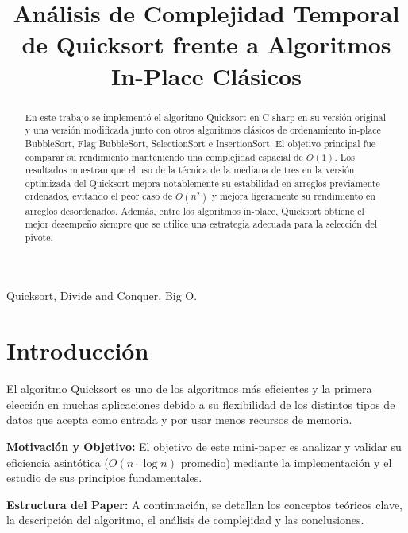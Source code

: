 \documentclass[conference]{IEEEtran}
\begin{document}
\title{Análisis de Complejidad Temporal de Quicksort frente a Algoritmos In-Place Clásicos}

\author{
\and
{}
}

\maketitle

\begin{abstract}
En este trabajo se implementó el algoritmo Quicksort en C sharp en su versión original y una versión modificada junto con otros algoritmos clásicos de ordenamiento in-place BubbleSort, Flag BubbleSort, SelectionSort e InsertionSort.
El objetivo principal fue comparar su rendimiento manteniendo una complejidad espacial de $O(1)$.
Los resultados muestran que  el uso de la técnica de la mediana de tres en la versión optimizada del Quicksort mejora notablemente su estabilidad en arreglos previamente ordenados, evitando el peor caso de $O(n^2)$ y mejora ligeramente su rendimiento en arreglos desordenados.
Además, entre los algoritmos in-place, Quicksort obtiene el mejor desempeño siempre que se utilice una estrategia adecuada para la selección del pivote.
\end{abstract}

\begin{IEEEkeywords}
Quicksort, Divide and Conquer, Big O.
\end{IEEEkeywords}


\section{Introducción}

El algoritmo Quicksort es uno de los algoritmos más eficientes y la 
primera elección en muchas aplicaciones debido a su flexibilidad de los distintos tipos de datos que acepta como entrada y por usar menos recursos de memoria.\par
\textbf{Motivación y Objetivo:} El objetivo de este mini-paper es analizar y validar su eficiencia asintótica ($O(n\cdot \log{n})$ promedio) mediante la implementación y el estudio de sus principios fundamentales.\par   
\textbf{Estructura del Paper:} A continuación, se detallan los conceptos teóricos clave, la descripción del algoritmo, el análisis de complejidad y las conclusiones.
\end{document}
